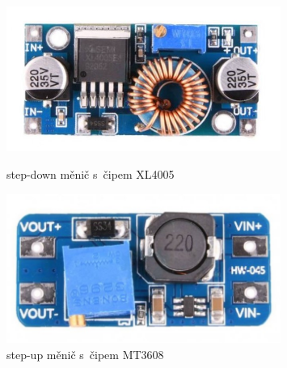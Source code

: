 \begin{figure}[htb]
  \centering
  \begin{minipage}{0.45\textwidth}
    \centering
  \includegraphics[width=0.8\textwidth]{img/XL4005.jpg}
  \caption{\label{fig:XL4005} step-down měnič s~čipem XL4005~\cite{laskakit-XL4005}}
  \end{minipage}\hfill
  \begin{minipage}{0.45\textwidth}
    \centering
  \includegraphics[width=0.8\textwidth]{img/MT3608.jpg}
  \caption{\label{fig:MT3608} step-up měnič s~čipem MT3608~\cite{laskakit-MT3608}}
  \end{minipage}
\end{figure}
